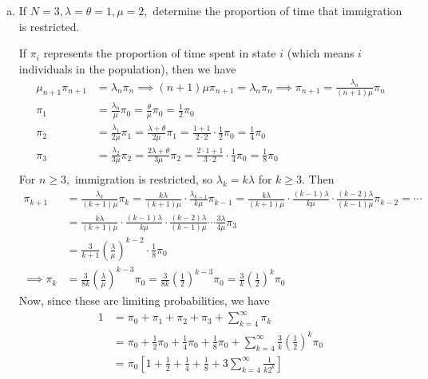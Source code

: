 \documentclass{article}
\begin{document}
\begin{itemize}
\begin{enumerate}[(a)]
			\item If $N=3, \lambda=\theta=1, \mu=2,$ determine the proportion of time that immigration is restricted.
				\begin{soln}
					If $\pi_i$ represents the proportion of time spent in state $i$ (which means $i$ individuals in the population), then we have
					\begin{align*}
						\mu_{n+1} \pi_{n+1} &= \lambda_n \pi_n \implies (n+1)\mu \pi_{n+1} = \lambda_n \pi_n \implies \pi_{n+1} = \frac{\lambda_n}{(n+1)\mu} \pi_n \\
						\pi_1 &= \frac{\lambda_0}{\mu} \pi_0 = \frac{\theta}{\mu} \pi_0 = \frac{1}{2} \pi_0 \\
						\pi_2 &= \frac{\lambda_1}{2\mu} \pi_1 = \frac{\lambda+\theta}{2\mu} \pi_1 = \frac{1+1}{2\cdot 2} \cdot \frac{1}{2} \pi_0 = \frac{1}{4} \pi_0 \\
						\pi_3 &= \frac{\lambda_2}{3\mu} \pi_2 = \frac{2\lambda+\theta}{3\mu} \pi_2 = \frac{2\cdot 1+1}{3\cdot 2} \cdot \frac{1}{4} \pi_0 = \frac{1}{8} \pi_0 \\
					\end{align*}
					For $n\ge 3,$ immigration is restricted, so $\lambda_k=k\lambda$ for $k\ge 3.$ Then
					\begin{align*}
						\pi_{k+1} &= \frac{\lambda_k}{(k+1)\mu} \pi_k = \frac{k\lambda}{(k+1)\mu} \cdot \frac{\lambda_{k-1}}{k\mu} \pi_{k-1} = \frac{k\lambda}{(k+1)\mu}\cdot \frac{(k-1)\lambda}{k\mu} \cdot \frac{(k-2)\lambda}{(k-1)\mu}\pi_{k-2} = \cdots \\
						&= \frac{k\lambda}{(k+1)\mu} \cdot \frac{(k-1)\lambda}{k\mu} \cdot \frac{(k-2)\lambda}{(k-1)\mu} \cdots \frac{3\lambda}{4\mu} \pi_3 \\
						&= \frac{3}{k+1} \left( \frac{\lambda}{\mu} \right)^{k-2}\cdot \frac{1}{8} \pi_0 \\
						\implies \pi_k &= \frac{3}{8k} \left( \frac{\lambda}{\mu} \right)^{k-3} \pi_0 = \frac{3}{8k} \left( \frac{1}{2} \right)^{k-3} \pi_0 = \frac{3}{k} \left( \frac{1}{2} \right)^{k} \pi_0
					\end{align*}
					Now, since these are limiting probabilities, we have
					\begin{align*}
						1 &= \pi_0+\pi_1+\pi_2 + \pi_3 + \sum_{k=4}^{\infty} \pi_k \\
						&= \pi_0 + \frac{1}{2}\pi_0 + \frac{1}{4} \pi_0 + \frac{1}{8} \pi_0 + \sum_{k=4}^{\infty} \frac{3}{k}\left( \frac{1}{2} \right)^{k} \pi_0 \\
						&= \pi_0 \left[ 1+\frac{1}{2} + \frac{1}{4} + \frac{1}{8} + 3\sum_{k=4}^{\infty} \frac{1}{k2^k} \right]

\end{align*}
\end{soln}
\end{enumerate}
\end{itemize}
\end{document}
